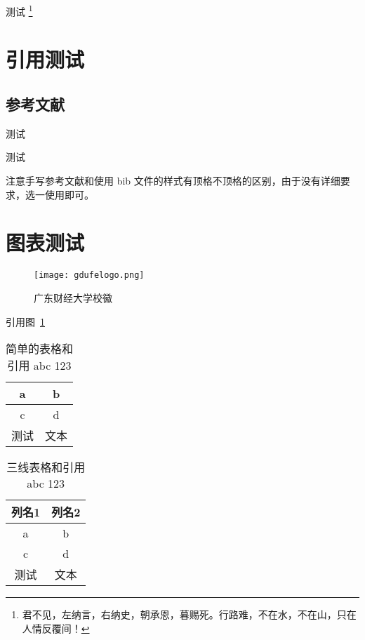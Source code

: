 测试 \footnote[3]{君不见，左纳言，右纳史，朝承恩，暮赐死。行路难，不在水，不在山，只在人情反覆间！}


\section{引用测试}

\subsection{参考文献}

测试 \cite{huangzh,anon-cn1,anon-cn2,anon-cn3,anon-cn4,anon-cn5}

测试 \cite*{anon-en1,anon-en2,anon-en3,anon-en4,anon-en5}

注意手写参考文献和使用 bib 文件的样式有顶格不顶格的区别，由于没有详细要求，选一使用即可。

\section{图表测试}

\begin{figure}[ht]
    \centering
    \texttt{[image: gdufelogo.png]}
    \caption{广东财经大学校徽}
    \label{fig:广东财经大学校徽}
\end{figure}

引用图~\ref{fig:广东财经大学校徽}

\begin{table}[ht]
    \centering
    \caption{%
        简单的表格和引用 abc 123 %
    }
    \label{table:简单的表格}
    \begin{tabular}{cc}
        \hline
        a  & b  \\ \hline
        c  & d  \\ \hline
        测试 & 文本 \\ \hline
    \end{tabular}
\end{table}

\begin{table}[ht]
    \centering
    \caption{%
        三线表格和引用 abc 123 %
    }
    \label{table:三线表格}
    \begin{tabular}{cc}
        \toprule
        列名1 & 列名2 \\ \midrule
        a   & b   \\
        c   & d   \\
        测试  & 文本  \\ \bottomrule
    \end{tabular}
\end{table}

